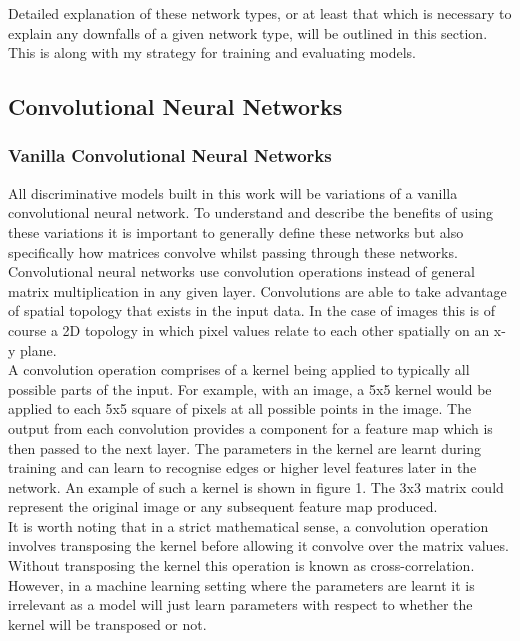 \documentclass{article}
\begin{document}
Detailed explanation of these network types, or at least that which is necessary to explain any downfalls of a given network type, will be outlined in this section. This is along with my strategy for training and evaluating models. \\ 

\subsection{Convolutional Neural Networks}

\subsubsection{Vanilla Convolutional Neural Networks}
All discriminative models built in this work will be variations of a vanilla convolutional neural network. To understand and describe the benefits of using these variations it is important to generally define these networks but also specifically how matrices convolve whilst passing through these networks.\\

Convolutional neural networks use convolution operations instead of general matrix multiplication in any given layer. Convolutions are able to take advantage of spatial topology that exists in the input data. In the case of images this is of course a 2D topology in which pixel values relate to each other spatially on an x-y plane.\\

A convolution operation comprises of a kernel being applied to  typically all possible parts of the input. For example, with an image, a 5x5 kernel would be applied to each 5x5 square of pixels at all possible points in the image. The output from each convolution provides a component for a feature map which is then passed to the next layer. The parameters in the kernel are learnt during training and can learn to recognise edges or higher level features later in the network. An example of such a kernel is shown in figure 1. The 3x3 matrix could represent the original image or any subsequent feature map produced.\\

It is worth noting that in a strict mathematical sense, a convolution operation involves transposing the kernel before allowing it convolve over the matrix values. Without transposing the kernel this operation is known as cross-correlation. However, in a machine learning setting where the parameters are learnt it is irrelevant as a model will just learn parameters with respect to whether the kernel will be transposed or not. \\
\end{document}
